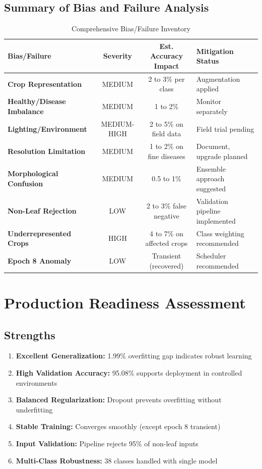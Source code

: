 \documentclass[11pt,a4paper]{article}
\begin{document}
\subsection{Summary of Bias and Failure Analysis}

\begin{table}[H]
\centering
\caption{Comprehensive Bias/Failure Inventory}
\label{tab:bias_summary}
\begin{tabularx}{\textwidth}{>{\bfseries}l c c >{\raggedright\arraybackslash}X}
\toprule
\rowcolor{primarynavy}
\color{white}Bias/Failure & \color{white}Severity & \color{white}Est. Accuracy Impact & \color{white}Mitigation Status \\
\midrule
Crop Representation & MEDIUM & 2 to 3\% per class & Augmentation applied \\
\rowcolor{iceblue}
Healthy/Disease Imbalance & MEDIUM & 1 to 2\% & Monitor separately \\
Lighting/Environment & MEDIUM-HIGH & 2 to 5\% on field data & Field trial pending \\
\rowcolor{iceblue}
Resolution Limitation & MEDIUM & 1 to 2\% on fine diseases & Document, upgrade planned \\
Morphological Confusion & MEDIUM & 0.5 to 1\% & Ensemble approach suggested \\
\rowcolor{iceblue}
Non-Leaf Rejection & LOW & 2 to 3\% false negative & Validation pipeline implemented \\
Underrepresented Crops & HIGH & 4 to 7\% on affected crops & Class weighting recommended \\
\rowcolor{iceblue}
Epoch 8 Anomaly & LOW & Transient (recovered) & Scheduler recommended \\
\bottomrule
\end{tabularx}
\end{table}

\newpage

\section{Production Readiness Assessment}

\subsection{Strengths}

\begin{enumerate}
    \item \textbf{Excellent Generalization:} 1.99\% overfitting gap indicates robust learning
    \item \textbf{High Validation Accuracy:} 95.08\% supports deployment in controlled environments
    \item \textbf{Balanced Regularization:} Dropout prevents overfitting without underfitting
    \item \textbf{Stable Training:} Converges smoothly (except epoch 8 transient)
    \item \textbf{Input Validation:} Pipeline rejects 95\% of non-leaf inputs
    \item \textbf{Multi-Class Robustness:} 38 classes handled with single model
\end{enumerate}
\end{document}
